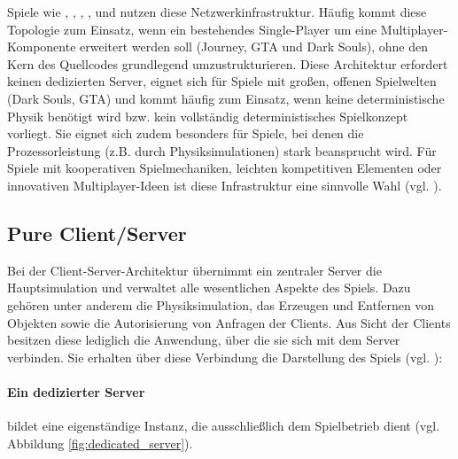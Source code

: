 Spiele wie , , , ,  und  nutzen diese Netzwerkinfrastruktur. Häufig kommt diese Topologie zum Einsatz, wenn ein bestehendes Single-Player um eine Multiplayer-Komponente erweitert werden soll (Journey, GTA und Dark Souls), ohne den Kern des Quellcodes grundlegend umzustrukturieren. Diese Architektur erfordert keinen dedizierten Server, eignet sich für Spiele mit großen, offenen Spielwelten (Dark Souls, GTA) und kommt häufig zum Einsatz, wenn keine deterministische Physik benötigt wird bzw. kein vollständig deterministisches Spielkonzept vorliegt. Sie eignet sich zudem besonders für Spiele, bei denen die Prozessorleistung (z.B. durch Physiksimulationen) stark beansprucht wird. Für Spiele mit kooperativen Spielmechaniken, leichten kompetitiven Elementen oder innovativen Multiplayer-Ideen ist diese Infrastruktur eine sinnvolle Wahl (vgl. \cite{noauthor_choosing_2024}).

\subsection{Pure Client/Server}
Bei der Client-Server-Architektur übernimmt ein zentraler Server die Hauptsimulation und verwaltet alle wesentlichen Aspekte des Spiels. Dazu gehören unter anderem die Physiksimulation, das Erzeugen und Entfernen von Objekten sowie die Autorisierung von Anfragen der Clients. Aus Sicht der Clients besitzen diese lediglich die Anwendung, über die sie sich mit dem Server verbinden. Sie erhalten über diese Verbindung die Darstellung des Spiels (vgl. \cite{noauthor_client-server_2024}):
\paragraph{Ein dedizierter Server} bildet eine eigenständige Instanz, die ausschließlich dem Spielbetrieb dient (vgl. Abbildung \ref{fig:dedicated_server}).

